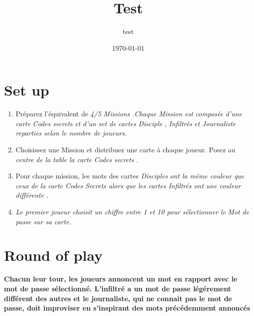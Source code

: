 \documentclass{article}%
\title{Test}%
\author{test}%
\date{\today}%
\begin{document}
%
\pagestyle{empty}%
\normalsize%
\maketitle%
\section{ Set up
}%
\label{sec:Setup}%
\begin{enumerate}%
\item%
%
  Préparez l'équivalent de %
\textit{4/5 Missions}%
\textit{.Chaque Mission est composée d'une carte }%
\textit{Codes secrets}%
\textit{ et d'un set de cartes }%
\textit{Disciple}%
\textit{,}%
\textit{ Infiltrés}%
\textit{ et Journaliste reparties selon le nombre de joueurs.
}%
\item%
%
  Choisissez une Mission et distribuez une carte à chaque joueur. Posez au %
\textit{centre}%
\textit{ de la table la carte }%
\textit{Codes secrets}%
\textit{.
}%
\item%
%
  Pour chaque mission, les mots des cartes %
\textit{Disciples}%
\textit{ ont la même couleur que ceux de la carte Codes Secrets alors que les cartes Infiltrés ont une couleur }%
\textit{différente}%
\textit{.
}%
\item%
%
\textit{Le premier joueur}%
\textit{ choisit un chiffre entre 1 et 10 pour sélectionner le }%
\textit{Mot de passe}%
\textit{ sur sa carte.
}%
\end{enumerate}

%
\section{ Round of play
}%
\label{sec:Roundofplay}%
\textbf{Chacun leur tour, les joueurs annoncent un mot en rapport avec le mot de passe sélectionné. L'infiltré a un mot de passe légérement différent des autres et le journaliste, qui ne connait pas le mot de passe, doit improviser en s'inspirant des mots précédemment annoncés}

%
\end{document}
